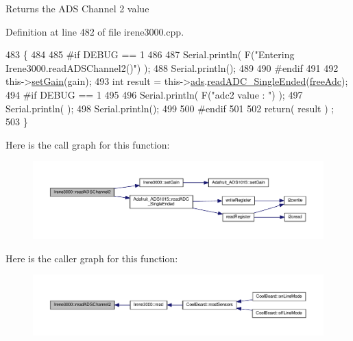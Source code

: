 \begin{DoxyReturn}{Returns}
the A\+DS Channel 2 value 
\end{DoxyReturn}


Definition at line 482 of file irene3000.\+cpp.


\begin{DoxyCode}
483 \{   
484 
485 \textcolor{preprocessor}{#if DEBUG == 1 }
486     
487     Serial.println( F(\textcolor{stringliteral}{"Entering Irene3000.readADSChannel2()"}) );
488     Serial.println();
489 
490 \textcolor{preprocessor}{#endif}
491 
492     this->\hyperlink{class_irene3000_aff7c5da186b388e7272e63ff88a20c34}{setGain}(gain);
493     \textcolor{keywordtype}{int} result = this->\hyperlink{class_irene3000_a1215e77ba761c9908d80d691f149e135}{ads}.\hyperlink{class_adafruit___a_d_s1015_a40f38b9e1f3ec397c0670dd632510235}{readADC\_SingleEnded}(\hyperlink{_irene3000_8h_a55497513af255250e464ed76543d46d7}{freeAdc});
494 \textcolor{preprocessor}{#if DEBUG == 1 }
495     
496     Serial.println( F(\textcolor{stringliteral}{"adc2 value : "}) );
497     Serial.println( );
498     Serial.println();
499 
500 \textcolor{preprocessor}{#endif}
501 
502     \textcolor{keywordflow}{return}( result ) ;
503 \}
\end{DoxyCode}
Here is the call graph for this function\+:\nopagebreak
\begin{figure}[H]
\begin{center}
\leavevmode
\includegraphics[width=350pt]{d6/d03/class_irene3000_ae73bd2ed14a199a7e83f4d6458476a7c_cgraph}
\end{center}
\end{figure}
Here is the caller graph for this function\+:\nopagebreak
\begin{figure}[H]
\begin{center}
\leavevmode
\includegraphics[width=350pt]{d6/d03/class_irene3000_ae73bd2ed14a199a7e83f4d6458476a7c_icgraph}
\end{center}
\end{figure}
\mbox{\label{class_irene3000_a78a87eb7cf295b95c12b2ebd51c2bb77}} 

